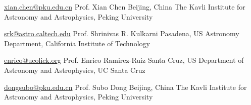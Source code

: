 


\begin{cvreferences}
	
\cvreference
	{\href{mailto:xian.chen@pku.edu.cn}{\faEnvelope\acvHeaderIconSep xian.chen@pku.edu.cn}} %
	{Prof. Xian Chen} %
	{Beijing, China} %
	{The Kavli Institute for Astronomy and Astrophysics, Peking University} %
	
	
	
\cvreference
{\href{mailto:srk@astro.caltech.edu}{\faEnvelope\acvHeaderIconSep srk@astro.caltech.edu}} %
{Prof. Shrinivas R. Kulkarni} %
{Pasadena, US} %
{Astronomy Department, California Institute of Technology} %


	
\cvreference
{\href{mailto:enrico@ucolick.org}{\faEnvelope\acvHeaderIconSep enrico@ucolick.org}} %
{Prof. Enrico Ramirez-Ruiz} %
{Santa Cruz, US} %
{Department of Astronomy and Astrophysics, UC Santa Cruz} %


\cvreference
{\href{dongsubo@pku.edu.cn}{\faEnvelope\acvHeaderIconSep dongsubo@pku.edu.cn}} %
{Prof. Subo Dong} %
{Beijing, China} %
{The Kavli Institute for Astronomy and Astrophysics, Peking University} %


\end{cvreferences}